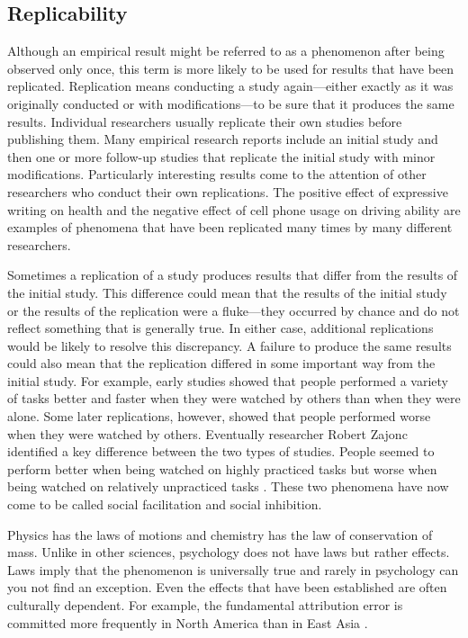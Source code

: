  \subsection{Replicability}
 Although an empirical result might be referred to as a phenomenon after being observed only once, this term is more likely to be used for results that have been replicated. Replication means conducting a study again---either exactly as it was originally conducted or with modifications---to be sure that it produces the same results. Individual researchers usually replicate their own studies before publishing them. Many empirical research reports include an initial study and then one or more follow-up studies that replicate the initial study with minor modifications. Particularly interesting results come to the attention of other researchers who conduct their own replications. The positive effect of expressive writing on health and the negative effect of cell phone usage on driving ability are examples of phenomena that have been replicated many times by many different researchers.

 Sometimes a replication of a study produces results that differ from the results of the initial study. This difference could mean that the results of the initial study or the results of the replication were a fluke---they occurred by chance and do not reflect something that is generally true. In either case, additional replications would be likely to resolve this discrepancy. A failure to produce the same results could also mean that the replication differed in some important way from the initial study. For example, early studies showed that people performed a variety of tasks better and faster when they were watched by others than when they were alone. Some later replications, however, showed that people performed worse when they were watched by others. Eventually researcher Robert Zajonc identified a key difference between the two types of studies. People seemed to perform better when being watched on highly practiced tasks but worse when being watched on relatively unpracticed tasks \citep{zajonc_social_1965}. These two phenomena have now come to be called social facilitation and social inhibition.

 Physics has the laws of motions and chemistry has the law of conservation of mass. Unlike in other sciences, psychology does not have laws but rather effects. Laws imply that the phenomenon is universally true and rarely in psychology can you not find an exception. Even the effects that have been established are often culturally dependent. For example, the fundamental attribution error is committed more frequently in North America than in East Asia \citep{miyamoto_cultural_2002}.

